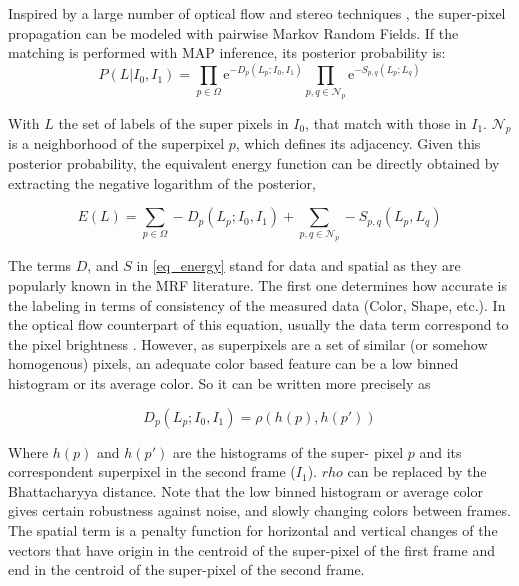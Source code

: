 \documentclass[a4paper, 10pt, conference]{ieeeconf}      %
\begin{document}
Inspired by a large number of optical flow and stereo
techniques \cite{c7}\cite{c12}\cite{c13}, the super-pixel propagation can be
modeled with pairwise Markov Random Fields. If
the matching is performed with MAP inference, its
posterior probability is: 
\begin{equation}
 P(L|I_0,I_1) = \displaystyle \prod_{p \in \Omega} \mathrm{e}^{-D_p(L_p;I_0,I_1)} 
\prod_{p,q \in \mathcal{N}_p} \mathrm{e}^{-S_{p,q}(L_p;L_q)} 
\label{eq_prob}
\end{equation}

With $L$ the set of labels of the super pixels in $I_0$,
that match with those in $I_1$.
$ \mathcal{N}_p $ is a neighborhood of the
superpixel $p$, which defines its adjacency. Given this posterior probability,
the equivalent energy function can be directly obtained
by extracting the negative logarithm of the posterior,

\begin{equation}
E(L) = \displaystyle \sum_{p \in \Omega} -D_p(L_p;I_0,I_1) +
\sum_{p,q \in \mathcal{N}_p} -S_{p,q}(L_p,L_q)
\label{eq_energy}
\end{equation}

The terms $D$, and $S$ in \ref{eq_energy} stand for data and spatial as they
are popularly known in the MRF literature. The first
one determines how accurate is the labeling in terms
of consistency of the measured data (Color, Shape,
etc.). In the optical flow counterpart of this equation,
usually the data term correspond to the pixel
brightness \cite{c7}\cite{c5}. However, as superpixels are a set
of similar (or somehow homogenous) pixels, an
adequate color based feature can be a low binned
histogram or its average color. So it can be written 
more precisely as

\begin{equation}
D_p(L_p;I_0,I_1) = \rho(h(p),h(p'))
\label{eq_Dp}
\end{equation}

Where $h(p)$ and $h(p')$ are the histograms of the super-
pixel $p$ and its correspondent superpixel in the
second frame ($I_1$). $rho$ can be replaced by the Bhattacharyya
 distance. Note that the low binned histogram or
average color gives certain robustness against noise,
and slowly changing colors between frames.
The spatial term is a penalty function for horizontal
and vertical changes of the vectors that have origin in
the centroid of the super-pixel of the first frame and
end in the centroid of the super-pixel of the second
frame.
\end{document}

